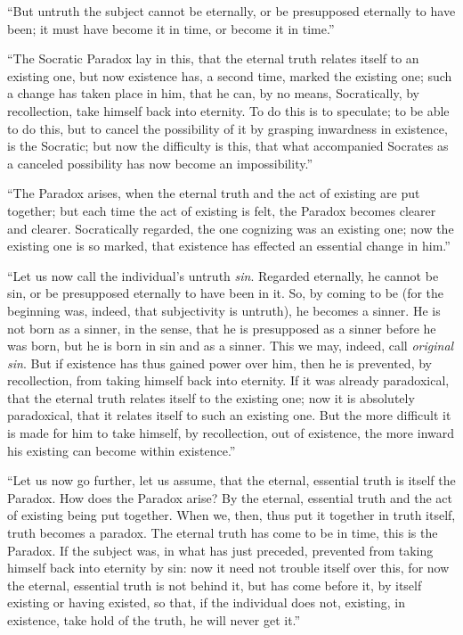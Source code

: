 \documentclass[12pt]{book}
\begin{document}
``But untruth the subject cannot be eternally, or be presupposed eternally to have been; it must have become it in time, or become it in time.''

``The Socratic Paradox lay in this, that the eternal truth relates itself to an existing one, but now existence has, a second time, marked the existing one; such a change has taken place in him, that he can, by no means, Socratically, by recollection, take himself back into eternity.
To do this is to speculate; to be able to do this, but to cancel the possibility of it by grasping inwardness in existence, is the Socratic; but now the difficulty is this, that what accompanied Socrates as a canceled possibility has now become an impossibility.''

``The Paradox arises, when the eternal truth and the act of existing are put together; but each time the act of existing is felt, the Paradox becomes clearer and clearer. Socratically regarded, the one cognizing was an existing one; now the existing one is so marked, that existence has effected an essential change in him.''

``Let us now call the individual's untruth \emph{sin}. Regarded eternally, he cannot be sin, or be presupposed eternally to have been in it. So, by coming to be (for the beginning was, indeed, that subjectivity is untruth), he becomes a sinner. He is not born as a sinner, in the sense, that he is presupposed as a sinner before he was born, but he is born in sin and as a sinner. This we may, indeed, call \emph{original sin}. But if existence has thus gained power over him, then he is prevented, by recollection, from taking himself back into eternity. If it was already paradoxical, that the eternal truth relates itself to the existing one; now it is absolutely paradoxical, that it relates itself to such an existing one. But the more difficult it is made for him to take himself, by recollection, out of existence, the more inward his existing can become within existence.''

``Let us now go further, let us assume, that the
eternal, essential truth is itself the Paradox. How does the Paradox arise? By the eternal, essential truth and the act of existing being put together. When we, then, thus put it together in truth itself, truth becomes a paradox. The eternal truth has come to be in time, this is the Paradox. If the subject was, in what has just preceded, prevented from taking himself back into eternity by sin: now it need not trouble itself over this, for now the eternal, essential truth is not behind it, but has come before it, by itself existing or having existed, so that, if the individual does not, existing, in existence, take hold of the truth, he will never get it.''
\end{document}
